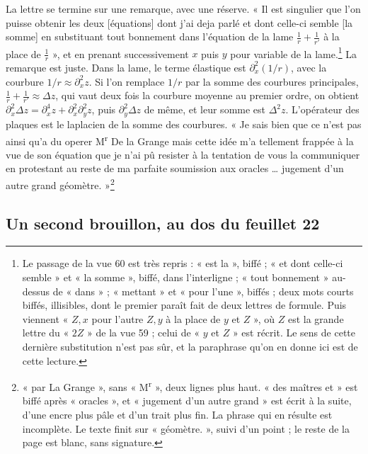 \documentclass[11pt,a4paper]{article}
\begin{document}
La lettre se termine sur une remarque, avec une réserve. « Il est singulier
que l'on puisse obtenir les deux [équations] dont j'ai deja parlé et dont
celle-ci semble [la somme] en substituant tout bonnement dans l'équation de la
lame \(\frac1r+\frac1{r'}\) à la place de \(\frac1r\) », et en prenant
successivement \(x\) puis \(y\) pour variable de la lame.\footnote{Le passage
de la vue 60 est très repris : « est la », biffé ; « et dont celle-ci
semble » et « la somme », biffé, dans l'interligne ; « tout bonnement »
au-dessus de « dans » ; « mettant » et « pour l'une », biffés ; deux mots
courts biffés, illisibles, dont le premier paraît fait de deux lettres de
formule. Puis viennent « \(Z,x\) pour l'autre \(Z,y\) à la place de \(y\) et
\(Z\) », où \(Z\) est la grande lettre du « \(2Z\) » de la vue 59 ; celui de
« \(y\) et \(Z\) » est récrit. Le sens de cette dernière substitution n'est
pas sûr, et la paraphrase qu'on en donne ici est de cette lecture.} La
remarque est juste. Dans la lame, le terme élastique est
\(\partial_x^2(1/r)\), avec la courbure \(1/r\approx\partial_x^2z\). Si l'on
remplace \(1/r\) par la somme des courbures principales,
\(\frac1r+\frac1{r'}\approx\Delta z\), qui vaut deux fois la courbure moyenne
au premier ordre, on obtient \(\partial_x^2\Delta z=\partial_x^4z+
\partial_x^2\partial_y^2z\), puis \(\partial_y^2\Delta z\) de même, et leur
somme est \(\Delta^2z\). L'opérateur des plaques est le laplacien de la somme
des courbures. « Je sais bien que ce n'est pas ainsi qu'a du operer
M\textsuperscript{r} De la Grange mais cette idée m'a tellement frappée à la
vue de son équation que je n'ai pû resister à la tentation de vous la
communiquer en protestant au reste de ma parfaite soumission aux oracles
\ldots{} jugement d'un autre grand géomètre. »\footnote{« par La Grange », sans
« M\textsuperscript{r} », deux lignes plus haut. « des maîtres et » est biffé
après « oracles », et « jugement d'un autre grand » est écrit à la suite,
d'une encre plus pâle et d'un trait plus fin. La phrase qui en résulte est
incomplète. Le texte finit sur « géomètre. », suivi d'un point ; le reste de
la page est blanc, sans signature.}

\subsection*{Un second brouillon, au dos du feuillet 22}
\end{document}

